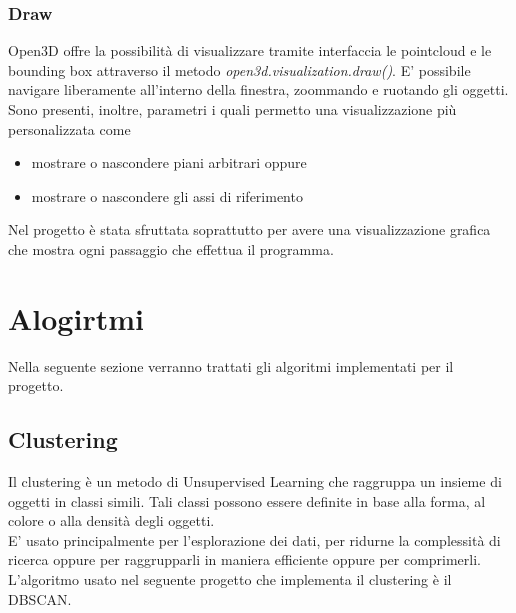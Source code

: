 \documentclass[italian]{article}
\begin{document}
\subsubsection{Draw}
Open3D offre la possibilità di visualizzare tramite interfaccia le pointcloud e le bounding box attraverso il metodo \textit{open3d.visualization.draw()}. E' possibile navigare liberamente all'interno della finestra, zoommando e ruotando gli oggetti.\\
Sono presenti, inoltre, parametri i quali permetto una visualizzazione più personalizzata come
\begin{itemize}
	\item mostrare o nascondere piani arbitrari oppure
	\item mostrare o nascondere gli assi di riferimento
\end{itemize}
Nel progetto è stata sfruttata soprattutto per avere una visualizzazione grafica che mostra ogni passaggio che effettua il programma.

\section*{Alogirtmi}
Nella seguente sezione verranno trattati gli algoritmi implementati per il progetto.
\subsection{Clustering}
Il clustering è un metodo di Unsupervised Learning che raggruppa un insieme di oggetti in classi simili. Tali classi possono essere definite in base alla forma, al colore o alla densità degli oggetti.\\
E' usato principalmente per l'esplorazione dei dati, per ridurne la complessità di ricerca oppure per raggrupparli in maniera efficiente oppure per comprimerli.\\
L'algoritmo usato nel seguente progetto che implementa il clustering è il DBSCAN.
\end{document}
